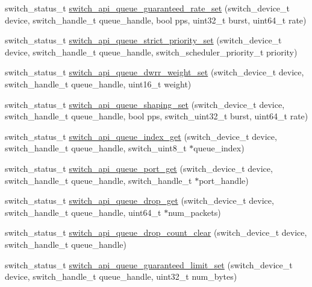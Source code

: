 \begin{DoxyCompactItemize}
\item 
switch\+\_\+status\+\_\+t \hyperlink{group__QUEUE_ga2fd306789d4d74268c419f1ef049fb05}{switch\+\_\+api\+\_\+queue\+\_\+guaranteed\+\_\+rate\+\_\+set} (switch\+\_\+device\+\_\+t device, switch\+\_\+handle\+\_\+t queue\+\_\+handle, bool pps, uint32\+\_\+t burst, uint64\+\_\+t rate)
\item 
switch\+\_\+status\+\_\+t \hyperlink{group__QUEUE_ga6f6da01f1f8be132ff0ace4da512a080}{switch\+\_\+api\+\_\+queue\+\_\+strict\+\_\+priority\+\_\+set} (switch\+\_\+device\+\_\+t device, switch\+\_\+handle\+\_\+t queue\+\_\+handle, switch\+\_\+scheduler\+\_\+priority\+\_\+t priority)
\item 
switch\+\_\+status\+\_\+t \hyperlink{group__QUEUE_ga680e48a7920869009a4f349a9644812c}{switch\+\_\+api\+\_\+queue\+\_\+dwrr\+\_\+weight\+\_\+set} (switch\+\_\+device\+\_\+t device, switch\+\_\+handle\+\_\+t queue\+\_\+handle, uint16\+\_\+t weight)
\item 
switch\+\_\+status\+\_\+t \hyperlink{group__QUEUE_ga761c698de45de8e484e513c20842955a}{switch\+\_\+api\+\_\+queue\+\_\+shaping\+\_\+set} (switch\+\_\+device\+\_\+t device, switch\+\_\+handle\+\_\+t queue\+\_\+handle, bool pps, switch\+\_\+uint32\+\_\+t burst, uint64\+\_\+t rate)
\item 
switch\+\_\+status\+\_\+t \hyperlink{group__QUEUE_gab74a31aea5220f701fa5fcb11eff1a96}{switch\+\_\+api\+\_\+queue\+\_\+index\+\_\+get} (switch\+\_\+device\+\_\+t device, switch\+\_\+handle\+\_\+t queue\+\_\+handle, switch\+\_\+uint8\+\_\+t $\ast$queue\+\_\+index)
\item 
switch\+\_\+status\+\_\+t \hyperlink{group__QUEUE_gac1e40b9cc3da02160a0cb39b6a7aec17}{switch\+\_\+api\+\_\+queue\+\_\+port\+\_\+get} (switch\+\_\+device\+\_\+t device, switch\+\_\+handle\+\_\+t queue\+\_\+handle, switch\+\_\+handle\+\_\+t $\ast$port\+\_\+handle)
\item 
switch\+\_\+status\+\_\+t \hyperlink{group__QUEUE_ga0155cba07d46d7d15499ed26111b238d}{switch\+\_\+api\+\_\+queue\+\_\+drop\+\_\+get} (switch\+\_\+device\+\_\+t device, switch\+\_\+handle\+\_\+t queue\+\_\+handle, uint64\+\_\+t $\ast$num\+\_\+packets)
\item 
switch\+\_\+status\+\_\+t \hyperlink{group__QUEUE_gad02b08f9a4a7c5a6c5e2b28059aae0b2}{switch\+\_\+api\+\_\+queue\+\_\+drop\+\_\+count\+\_\+clear} (switch\+\_\+device\+\_\+t device, switch\+\_\+handle\+\_\+t queue\+\_\+handle)
\item 
switch\+\_\+status\+\_\+t \hyperlink{group__QUEUE_ga93cd0c37e64b51f733f01d17046c6677}{switch\+\_\+api\+\_\+queue\+\_\+guaranteed\+\_\+limit\+\_\+set} (switch\+\_\+device\+\_\+t device, switch\+\_\+handle\+\_\+t queue\+\_\+handle, uint32\+\_\+t num\+\_\+bytes)

\end{DoxyCompactItemize}
